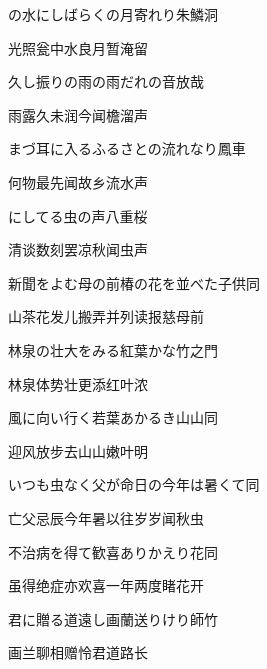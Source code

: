 \begin{haiku}
    {\FH {}の水にしばらくの月寄れり}\hfill{\FH 朱鱗洞}

    {\FK 光照瓮中水良月暂淹留}
\end{haiku}

\begin{haiku}
    {\FH 久し振りの雨の雨だれの音}\hfill{\FH 放哉}

    {\FK 雨露久未润今闻檐溜声}
\end{haiku}

\begin{haiku}
    {\FH まづ耳に入るふるさとの流れなり}\hfill{\FH 鳳車}

    {\FK 何物最先闻故乡流水声}
\end{haiku}

\begin{haiku}
    {\FH {}にしてる虫の声}\hfill{\FH 八重桜}

    {\FK 清谈数刻罢凉秋闻虫声}
\end{haiku}

\begin{haiku}
    {\FH 新聞をよむ母の前椿の花を並べた子供}\hfill{\FH 同}

    {\FK 山茶花发儿搬弄并列读报慈母前}
\end{haiku}

\begin{haiku}
    {\FH 林泉の壮大をみる紅葉かな}\hfill{\FH 竹之門}

    {\FK 林泉体势壮更添红叶浓}
\end{haiku}

\begin{haiku}
    {\FH 風に向い行く若葉あかるき山山}\hfill{\FH 同}

    {\FK 迎风放步去山山嫩叶明}
\end{haiku}

\begin{haiku}
    {\FH いつも虫なく父が命日の今年は暑くて}\hfill{\FH 同}

    {\FK 亡父忌辰今年暑以往岁岁闻秋虫}
\end{haiku}

\begin{haiku}
    {\FH 不治病を得て歓喜ありかえり花}\hfill{\FH 同}

    {\FK 虽得绝症亦欢喜一年两度睹花开}
\end{haiku}

\begin{haiku}
    {\FH 君に贈る道遠し画蘭送りけり}\hfill{\FH 師竹}

    {\FK 画兰聊相赠怜君道路长}
\end{haiku}

